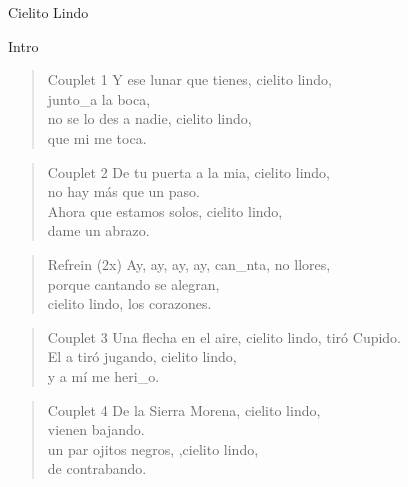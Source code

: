 \begin{song}[copla]{Cielito Lindo}
\begin{instrumental}{Intro}
\measure{}\measure{}\measure{}\measure{}\measure{}\measure{}
\measure{}\measure{}\measure{}\measure{}\measure{}\measure{}\measure{}
\measure{}\measure*{}
\end{instrumental}

\begin{verse}{Couplet 1}
Y ese lunar que tienes, cielito lindo,\\
junto\_a la boca,\hspace{5em}\\
\chord{}no se lo des a nadie, cielito lindo,\\
que mi me toca.\\
\end{verse}
\begin{verse}{Couplet 2}
De tu puerta a la mia, cielito lindo,\\
no hay más que un paso.\\
\chord{}Ahora que estamos solos, cielito lindo,\\
dame un abrazo.\\
\end{verse}
\begin{verse}{Refrein (2x)}
Ay, ay, ay, ay,\hspace{1em}\hspace{\wlskip} can\_nta, no llores,\\
porque cantando se alegran,\\
cielito lindo, los corazones.\\
\end{verse}
\begin{verse}{Couplet 3}
Una flecha en el aire, cielito lindo,
tiró Cupido.\\
\chord{}El a tiró jugando, cielito lindo,\\
y a mí me heri\_o.\\
\end{verse}
\begin{verse}{Couplet 4}
De la Sierra Morena, cielito lindo,\\
vienen bajando.\\
\chord{}un par ojitos negros, ,cielito lindo,\\
de contrabando.\\
\end{verse}
\end{song}

